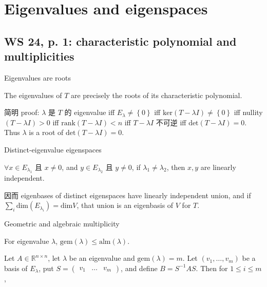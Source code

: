 \chapter{Eigenvalues and eigenspaces}

\section{WS 24, p. 1: characteristic polynomial and multiplicities}

\begin{theorem}{Eigenvalues are roots}

The eigenvalues of \(T\) are precisely the roots of its characteristic polynomial.

\end{theorem}

简明 proof: \(\lambda\) 是 \(T\) 的 eigenvalue iff \(E_{\lambda} \neq \left\{ 0 \right\}\) iff \(\text{ker}\left( {T - \lambda I} \right) \neq \left\{ 0 \right\}\) iff nullity\(\left( {T - \lambda I} \right) > 0\) iff \(\text{rank}\left( {T - \lambda I} \right) < n\) iff \(T - \lambda I\) 不可逆 iff \(\text{det}\left( {T - \lambda I} \right) = 0\). Thus \(\lambda\) is a root of \(\text{det}\left( {T - \lambda I} \right) = 0\).

\begin{theorem}{Distinct-eigenvalue eigenspaces}

\(\forall x \in E_{\lambda_{1}}\) 且 \(x \neq 0\), and \(y \in E_{\lambda_{2}}\) 且 \(y \neq 0\), if \(\lambda_{1} \neq \lambda_{2}\), then \(x,y\) are linearly independent.

\end{theorem}

因而 eigenbases of distinct eigenspaces have linearly independent union, and if \(\sum_{i}\text{dim}\left( E_{\lambda_{i}} \right) = \text{dim}V\), that union is an eigenbasis of \(V\) for \(T\).

\begin{theorem}{Geometric and algebraic multiplicity}

For eigenvalue \(\lambda\), \(\text{gem}(\lambda) \leq \text{alm}(\lambda)\).

\end{theorem}

Let \(A \in \mathbb{R}^{n \times n}\), let \(\lambda\) be an eigenvalue and \(\text{gem}(\lambda) = m\). Let \(\left( {v_{1},\ldots,v_{m}} \right)\) be a basis of \(E_{\lambda}\), put \(S = \begin{pmatrix}
v_{1} & \ldots & v_{m}
\end{pmatrix}\), and define \(B = S^{- 1}AS\). Then for \(1 \leq i \leq m\),

